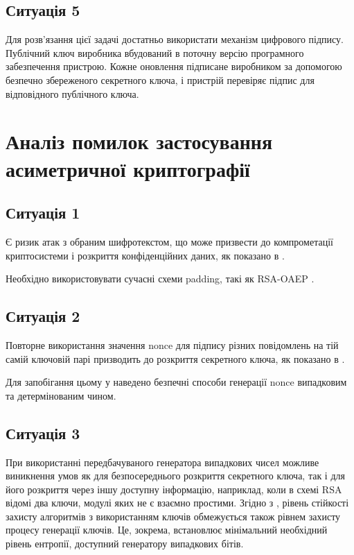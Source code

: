 \documentclass{kpi-lab}
\begin{document}
\section{Ситуація 5}

Для розв'язання цієї задачі достатньо використати
механізм цифрового підпису. Публічний ключ виробника
вбудований в поточну версію програмного забезпечення
пристрою. Кожне оновлення підписане виробником за допомогою
безпечно збереженого секретного ключа, і пристрій
перевіряє підпис для відповідного публічного ключа.

\chapter{Аналіз помилок застосування асиметричної криптографії}

\section{Ситуація 1}

Є ризик атак з обраним шифротекстом, що може призвести до
компрометації криптосистеми і розкриття конфіденційних даних,
як показано в \cite{Bleichenbacher1998,cryptoeprint:2017/1189}.

Необхідно використовувати сучасні схеми padding, такі як
RSA-OAEP \cite{rfc8017}.

\section{Ситуація 2}

Повторне використання значення nonce для підпису різних
повідомлень на тій самій ключовій парі призводить до
розкриття секретного ключа, як показано в
\cite{cryptoeprint:2025/654}.

Для запобігання цьому у \cite{fips186-5} наведено безпечні
способи генерації nonce випадковим та детермінованим чином.

\section{Ситуація 3}

При використанні передбачуваного генератора випадкових чисел
можливе виникнення умов як для безпосереднього розкриття
секретного ключа, так і для його розкриття через іншу
доступну інформацію, наприклад, коли в схемі RSA відомі два
ключи, модулі яких не є взаємно простими.
Згідно з \cite{nist-sp-800-133r2}, рівень стійкості захисту
алгоритмів з використанням ключів обмежується також рівнем захисту
процесу генерації ключів. Це, зокрема, встановлює
мінімальний необхідний рівень ентропії, доступний
генератору випадкових бітів.
\end{document}
